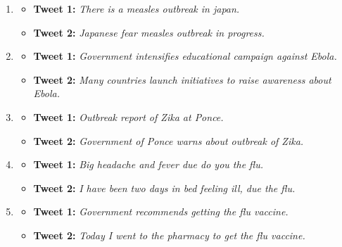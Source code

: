 \documentclass[12pt]{report}
\begin{document}
\begin{enumerate}
	\item {}
	\begin{itemize}
		\item \textbf{Tweet 1:} \textit{There is a measles outbreak in japan.}
		\item \textbf{Tweet 2:} \textit{Japanese fear measles outbreak in progress.}
	\end{itemize}

	\item {}
	\begin{itemize}
		\item \textbf{Tweet 1:} \textit{Government intensifies educational campaign against Ebola.}
		\item \textbf{Tweet 2:} \textit{Many countries launch initiatives to raise awareness about Ebola.}
	\end{itemize}

	\item {}
	\begin{itemize}
		\item \textbf{Tweet 1:} \textit{Outbreak report of Zika at Ponce.}
		\item \textbf{Tweet 2:} \textit{Government of Ponce warns about outbreak of Zika.}
	\end{itemize}


	\item {}
	\begin{itemize}
		\item \textbf{Tweet 1:} \textit{Big headache and fever due do you the flu.}
		\item \textbf{Tweet 2:} \textit{I have been two days in bed feeling ill, due the flu.}
	\end{itemize}


	\item {}
	\begin{itemize}
		\item \textbf{Tweet 1:} \textit{Government recommends getting the flu vaccine.}
		\item \textbf{Tweet 2:} \textit{Today I went to the pharmacy to get the flu vaccine.}
	\end{itemize}
\end{enumerate}
\end{document}
